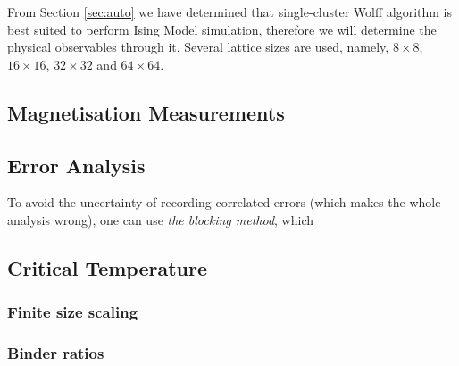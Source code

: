From Section \ref{sec:auto} we have determined that single-cluster Wolff algorithm is best suited to perform Ising Model simulation, therefore we will determine the physical observables through it. Several lattice sizes are used, namely, $8 \times 8$, $16 \times 16$, $32 \times 32$ and $64 \times 64$.



\subsection{Magnetisation Measurements}

\subsection{Error Analysis}

To avoid the uncertainty of recording correlated errors (which makes the whole analysis wrong), one can use \textit{the blocking method}, which 

\subsection{Critical Temperature}

\subsubsection*{Finite size scaling}

\subsubsection*{Binder ratios}
